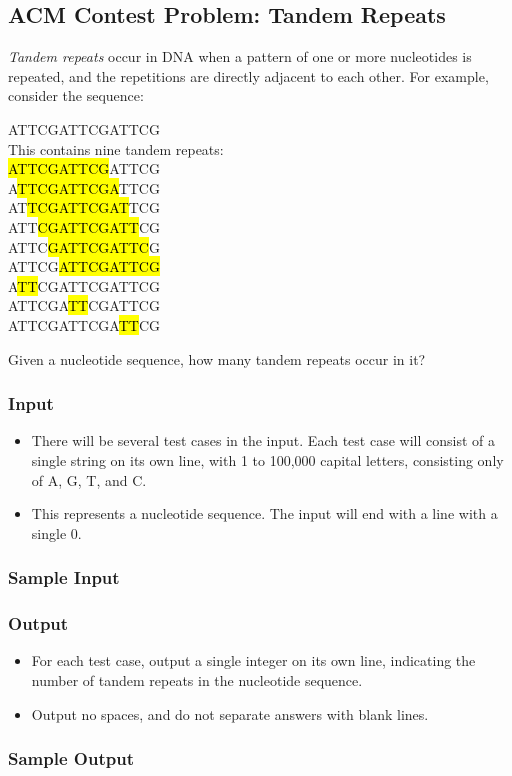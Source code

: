 \subsection{ACM Contest Problem: Tandem Repeats\cite{acmsoutheastregional2013}}
\textit{Tandem repeats} occur in DNA when a pattern of one or more nucleotides is repeated, and the repetitions are directly adjacent to each other.
For example, consider the sequence:
\begin{center}
	ATTCGATTCGATTCG\\
	This contains nine tandem repeats:\\
	\hl{ATTCGATTCG}ATTCG\\
	A\hl{TTCGATTCGA}TTCG\\
	AT\hl{TCGATTCGAT}TCG\\
	ATT\hl{CGATTCGATT}CG\\
	ATTC\hl{GATTCGATTC}G\\
	ATTCG\hl{ATTCGATTCG}\\
	A\hl{TT}CGATTCGATTCG\\
	ATTCGA\hl{TT}CGATTCG\\
	ATTCGATTCGA\hl{TT}CG\\
\end{center}

Given a nucleotide sequence, how many tandem repeats occur in it?

\subsubsection{Input}
\begin{itemize}
	\item There will be several test cases in the input.
	Each test case will consist of a single string on its own line, with 1 to 100,000 capital letters, consisting only of A, G, T, and C.
	\item This represents a nucleotide sequence.
	The input will end with a line with a single 0.
\end{itemize}

\subsubsection{Sample Input}

\subsubsection{Output}
\begin{itemize}
	\item For each test case, output a single integer on its own line, indicating the number of tandem repeats in the nucleotide sequence.
	\item Output no spaces, and do not separate answers with blank lines.
\end{itemize}

\subsubsection{Sample Output}
